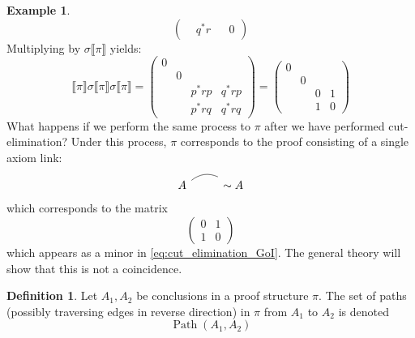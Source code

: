 \documentclass[12pt]{article}
\theoremstyle{plain}
\theoremstyle{definition}
\newtheorem{defn}[thm]{Definition} %
\newtheorem{example}[thm]{Example}
\newcommand{\negation}{\sim}
\begin{document}
\begin{example}
\begin{equation}
\begin{pmatrix}
				& q^\ast r &&0
			\end{pmatrix}
		\end{equation}
		Multiplying by $\sigma \llbracket \pi \rrbracket$ yields:
		\begin{equation}\label{eq:cut_elimination_GoI}
			\llbracket \pi \rrbracket \sigma \llbracket \pi \rrbracket \sigma \llbracket \pi \rrbracket = 
			\begin{pmatrix}
				0&&&\\
				&0&&\\
				&& p^\ast r p & q^\ast r p\\
				&& p^\ast r q & q^\ast r q
			\end{pmatrix}
			=
			\begin{pmatrix}
				0&&&\\
				&0&&\\
				&& 0 & 1\\
				&& 1 & 0
			\end{pmatrix}
		\end{equation}
		What happens if we perform the same process to $\pi$ after we have performed cut-elimination? Under this process, $\pi$ corresponds to the proof consisting of a single axiom link:
		\begin{equation}
			\begin{tikzcd}
				A\arrow[r,bend left,dash] & \negation A
			\end{tikzcd}
		\end{equation}
		which corresponds to the matrix
		\begin{equation}
			\begin{pmatrix}
				0 & 1\\
				1 & 0
			\end{pmatrix}
		\end{equation}
		which appears as a minor in \eqref{eq:cut_elimination_GoI}. The general theory will show that this is not a coincidence.
	\end{example}
	\begin{defn}
		Let $A_1,A_2$ be conclusions in a proof structure $\pi$. The set of paths (possibly traversing edges in reverse direction) in $\pi$ from $A_1$ to $A_2$ is denoted
		\begin{equation}
			\operatorname{Path}(A_1,A_2)
		\end{equation}
	\end{defn}
\end{document}
